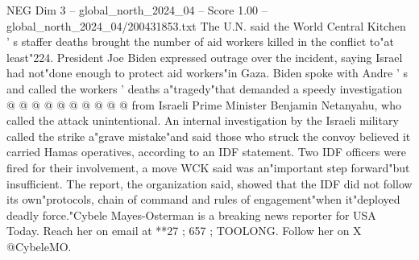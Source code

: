 \begin{textsample}{NEG Dim 3 – global\_north\_2024\_04 – Score 1.00 – global\_north\_2024\_04/200431853.txt}
The U.N. said the World Central Kitchen ' s staffer deaths brought the number of aid workers killed in the conflict to"at least"224.
President Joe Biden expressed outrage over the incident, saying Israel had not"done enough to protect aid workers"in Gaza.
Biden spoke with Andre ' s and called the workers ' deaths a"tragedy"that demanded a speedy investigation @ @ @ @ @ @ @ @ @ @ from Israeli Prime Minister Benjamin Netanyahu, who called the attack unintentional.
An internal investigation by the Israeli military called the strike a"grave mistake"and said those who struck the convoy believed it carried Hamas operatives, according to an IDF statement.
Two IDF officers were fired for their involvement, a move WCK said was an"important step forward"but insufficient.
The report, the organization said, showed that the IDF did not follow its own"protocols, chain of command and rules of engagement"when it"deployed deadly force."Cybele Mayes-Osterman is a breaking news reporter for USA Today.
Reach her on email at **27 ; 657 ; TOOLONG.
Follow her on X @CybeleMO.

\end{textsample}
